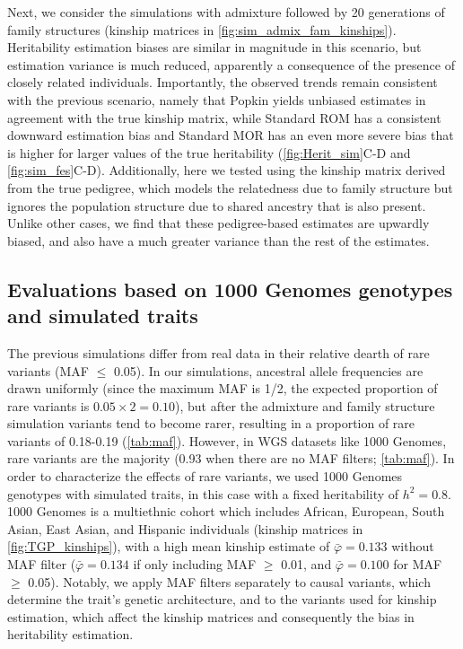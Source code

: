 \documentclass[11pt]{article}
\begin{document}
Next, we consider the simulations with admixture followed by 20 generations of family structures (kinship matrices in \cref{fig:sim_admix_fam_kinships}).  Heritability estimation biases are similar in magnitude in this scenario, but estimation variance is much reduced, apparently a consequence of the presence of closely related individuals.  Importantly, the observed trends remain consistent with the previous scenario, namely that Popkin yields unbiased estimates in agreement with the true kinship matrix, while Standard ROM has a consistent downward estimation bias and Standard MOR has an even more severe bias that is higher for larger values of the true heritability (\cref{fig:Herit_sim}C-D and \cref{fig:sim_fes}C-D).  Additionally, here we tested using the kinship matrix derived from the true pedigree, which models the relatedness due to family structure but ignores the population structure due to shared ancestry that is also present.  Unlike other cases, we find that these pedigree-based estimates are upwardly biased, and also have a much greater variance than the rest of the estimates.

\subsection{Evaluations based on 1000 Genomes genotypes and simulated traits}

The previous simulations differ from real data in their relative dearth of rare variants (MAF $\le$ 0.05).
In our simulations, ancestral allele frequencies are drawn uniformly (since the maximum MAF is 1/2, the expected proportion of rare variants is $0.05 \times 2 = 0.10$), but after the admixture and family structure simulation variants tend to become rarer, resulting in a proportion of rare variants of 0.18-0.19 (\cref{tab:maf}). 
However, in WGS datasets like 1000 Genomes, rare variants are the majority (0.93 when there are no MAF filters; \cref{tab:maf}).  In order to characterize the effects of rare variants, we used 1000 Genomes genotypes with simulated traits, in this case with a fixed heritability of $h^2 = 0.8$.  1000 Genomes is a multiethnic cohort which includes African, European, South Asian, East Asian, and Hispanic individuals (kinship matrices in \cref{fig:TGP_kinships}), with a high mean kinship estimate of $\bar{\varphi} = 0.133$ without MAF filter ($\bar{\varphi} = 0.134$ if only including MAF $\ge$ 0.01, and $\bar{\varphi} = 0.100$ for MAF $\ge$ 0.05). Notably, we apply MAF filters separately to causal variants, which determine the trait’s genetic architecture, and to the variants used for kinship estimation, which affect the kinship matrices and consequently the bias in heritability estimation.
\end{document}
